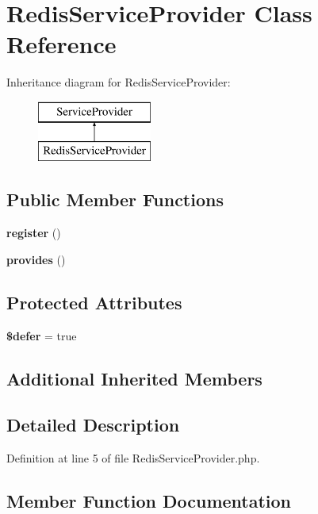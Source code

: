 \section{Redis\+Service\+Provider Class Reference}
\label{class_illuminate_1_1_redis_1_1_redis_service_provider}
Inheritance diagram for Redis\+Service\+Provider\+:\begin{figure}[H]
\begin{center}
\leavevmode
\includegraphics[height=2.000000cm]{class_illuminate_1_1_redis_1_1_redis_service_provider}
\end{center}
\end{figure}
\subsection*{Public Member Functions}
\begin{DoxyCompactItemize}
\item 
{\bf register} ()
\item 
{\bf provides} ()
\end{DoxyCompactItemize}
\subsection*{Protected Attributes}
\begin{DoxyCompactItemize}
\item 
{\bf \$defer} = true
\end{DoxyCompactItemize}
\subsection*{Additional Inherited Members}


\subsection{Detailed Description}


Definition at line 5 of file Redis\+Service\+Provider.\+php.



\subsection{Member Function Documentation}
